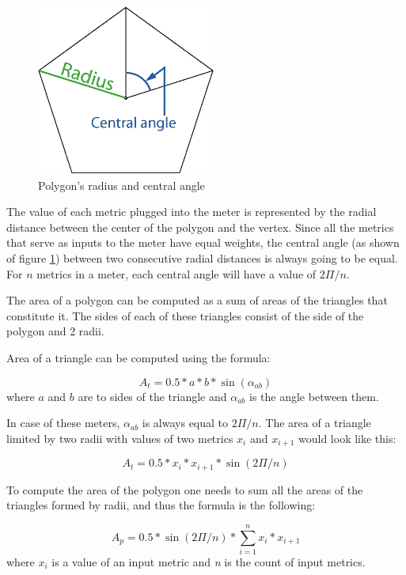 \documentclass{uvamscse}
\begin{document}
\begin{figure}[h]
\centering
\includegraphics[scale=0.5]{angleradius}
\caption{Polygon's radius and central angle}
\label{figure:polygon1}
\end{figure}

The value of each metric plugged into the meter is represented by the radial distance between the center of the polygon and the vertex. Since all the metrics that serve as inputs to the meter have equal weights, the central angle (as shown of figure \ref{figure:polygon1}) between two consecutive radial distances is always going to be equal. For \textit{$n$} metrics in a meter, each central angle will have a value of \textit{$2\Pi/n$}.

The area of a polygon can be computed as a sum of areas of the triangles that constitute it. The sides of each of these triangles consist of the side of the polygon and 2 radii.

Area of a triangle can be computed using the formula:
\begin{center}
  $$A_t = 0.5 * a*b * \sin(\alpha_{ab}) $$
  where \textit{$a$} and \textit{$b$} are to sides of the triangle and $\alpha_{ab}$ is the angle between them.
\end{center}

In case of these meters, $\alpha_{ab}$ is always equal to $2\Pi/n$. The area of a triangle limited by two radii with values of two metrics $x_i$ and $x_{i+1}$ would look like this:
\begin{center}
  $$A_t = 0.5 * x_i*x_{i+1} * \sin(2\Pi/n) $$
\end{center}

To compute the area of the polygon one needs to sum all the areas of the triangles formed by radii, and thus the formula is the following:
\begin{center}
  \texttt{$$A_p = 0.5 * \sin(2\Pi/n) * \sum_{i=1}^{n}x_i*x_{i+1}$$}
  where \textit{$x_i$} is a value of an input metric and \textit{n} is the count of input metrics.
\end{center}
\end{document}
